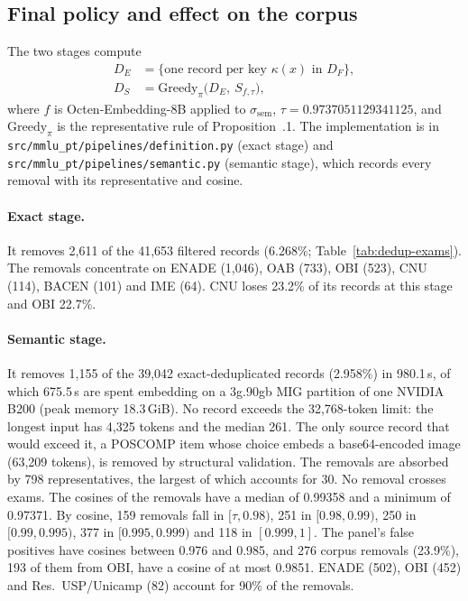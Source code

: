 \subsection{Final policy and effect on the corpus}
\label{app:dedup-final}

The two stages compute
\begin{equation}
\begin{aligned}
D_E &= \{\text{one record per key } \kappa(x) \text{ in } D_F\},\\
D_S &= \mathrm{Greedy}_{\pi}\bigl(D_E,\ S_{f,\tau}\bigr),
\end{aligned}
\end{equation}
where $f$ is Octen-Embedding-8B applied to $\sigma_{\mathrm{sem}}$,
$\tau=0.9737051129341125$, and $\mathrm{Greedy}_{\pi}$ is the representative
rule of Proposition~\thesection.1. The implementation is in
\texttt{src/mmlu\_pt/pipelines/definition.py} (exact stage) and
\texttt{src/mmlu\_pt/pipelines/semantic.py} (semantic stage), which records
every removal with its representative and cosine.

\paragraph{Exact stage.} It removes 2,611 of the 41,653 filtered records
(6.268\%; Table~\ref{tab:dedup-exams}). The removals concentrate on ENADE
(1,046), OAB (733), OBI (523), CNU (114), BACEN (101) and IME (64). CNU loses
23.2\% of its records at this stage and OBI 22.7\%.

\paragraph{Semantic stage.} It removes 1,155 of the 39,042 exact-deduplicated
records (2.958\%) in 980.1\,s, of which 675.5\,s are spent embedding on a
3g.90gb MIG partition of one NVIDIA B200 (peak memory 18.3\,GiB). No record
exceeds the 32,768-token limit: the longest input has 4,325 tokens and the
median 261. The only source record that would exceed it, a POSCOMP item whose
choice embeds a base64-encoded image (63,209 tokens), is removed by structural
validation.
The removals are absorbed by 798 representatives, the largest of which
accounts for 30. No removal crosses exams. The cosines of the removals have a
median of 0.99358 and a minimum of 0.97371. By cosine, 159 removals fall in
$[\tau, 0.98)$, 251 in $[0.98, 0.99)$, 250 in $[0.99, 0.995)$, 377 in
$[0.995, 0.999)$ and 118 in $[0.999, 1]$. The panel's false positives have
cosines between 0.976 and 0.985, and 276 corpus removals (23.9\%), 193 of
them from OBI, have a cosine of at most 0.9851. ENADE (502), OBI (452) and
Res.\ USP/Unicamp (82) account for 90\% of the removals.


